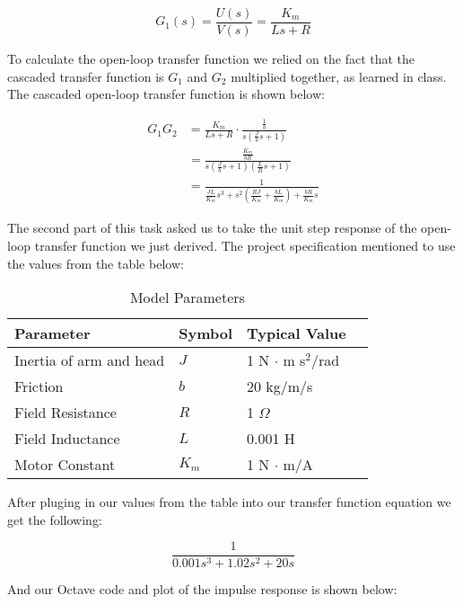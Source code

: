 \documentclass{article}
\begin{document}
$$G_1(s) = \frac{U(s)}{V(s)} = \frac{K_m}{Ls + R}$$

To calculate the open-loop transfer function we relied on the fact
that the cascaded transfer function is $G_1$ and $G_2$ multiplied
together, as learned in class. The cascaded open-loop transfer
function is shown below:

\begin{align*}
  G_1G_2 &= \frac{K_m}{Ls+R} \cdot \frac{\frac{1}{b}}{s(\frac{J}{b}s + 1)} \\
         &= \frac{\frac{K_m}{bR}}{s\left(\frac{J}{b}s + 1\right)  \left(\frac{L}{R}s + 1\right)} \\
         &= \frac{1}{\frac{JL}{K_m}s^3 + s^2\left( \frac{RJ}{K_m} + \frac{bL}{K_m} \right) + \frac{bR}{K_m}s}
\end{align*}

The second part of this task asked us to take the unit step response
of the open-loop transfer function we just derived. The project
specification mentioned to use the values from the table below:

\begin{table}[H]
  \begin{center}
    \begin{tabular}{ | l | l | l | p{5cm} |}
    \hline
    Parameter & Symbol & Typical Value \\ \hline
    Inertia of arm and head & $J$ & 1 N $\cdot$ m s$^2$/rad \\ \hline 
    Friction & $b$ & 20 kg/m/s \\ \hline
    Field Resistance & $R$ & 1 $\Omega$ \\ \hline
    Field Inductance & $L$ & 0.001 H \\ \hline
    Motor Constant & $K_m$ & 1 N $\cdot$ m/A \\ \hline
   \end{tabular}
 \end{center}
 \caption{Model Parameters}
 \label{table:param}
\end{table}

After pluging in our values from the table into our transfer function
equation we get the following:

$$\frac{1}{0.001s^3 + 1.02 s^2 + 20s}$$

And our Octave code and plot of the impulse response is shown below:


\end{document}

